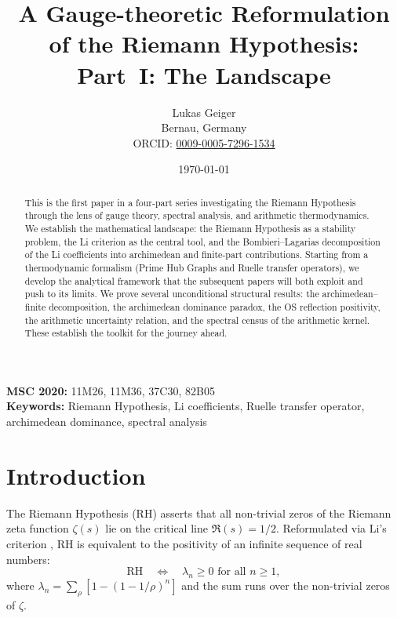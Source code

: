 \documentclass[12pt,a4paper]{article}
\title{A Gauge-theoretic Reformulation of the Riemann Hypothesis:\\
Part~I: The Landscape}
\author{Lukas Geiger\\
\small Bernau, Germany\\
\small ORCID: \href{https://orcid.org/0009-0005-7296-1534}{0009-0005-7296-1534}}
\date{\today}
\theoremstyle{definition}
\theoremstyle{remark}
\begin{document}
\maketitle

\begin{abstract}
This is the first paper in a four-part series investigating the Riemann Hypothesis through the lens of gauge theory, spectral analysis, and arithmetic thermodynamics. We establish the mathematical landscape: the Riemann Hypothesis as a stability problem, the Li criterion as the central tool, and the Bombieri--Lagarias decomposition of the Li coefficients into archimedean and finite-part contributions. Starting from a thermodynamic formalism (Prime Hub Graphs and Ruelle transfer operators), we develop the analytical framework that the subsequent papers will both exploit and push to its limits. We prove several unconditional structural results: the archimedean--finite decomposition, the archimedean dominance paradox, the OS reflection positivity, the arithmetic uncertainty relation, and the spectral census of the arithmetic kernel. These establish the toolkit for the journey ahead.
\end{abstract}

\noindent\textbf{MSC 2020:} 11M26, 11M36, 37C30, 82B05\\
\textbf{Keywords:} Riemann Hypothesis, Li coefficients, Ruelle transfer operator, archimedean dominance, spectral analysis

\tableofcontents


\section{Introduction}
\label{sec:intro}

The Riemann Hypothesis (RH) asserts that all non-trivial zeros of the Riemann zeta function $\zeta(s)$ lie on the critical line $\Re(s) = 1/2$. Reformulated via Li's criterion \cite{Li1997}, RH is equivalent to the positivity of an infinite sequence of real numbers:
\begin{equation}
\label{eq:li-criterion}
\text{RH} \quad \Longleftrightarrow \quad \lambda_n \geq 0 \text{ for all } n \geq 1,
\end{equation}
where $\lambda_n = \sum_\rho [1 - (1-1/\rho)^n]$ and the sum runs over the non-trivial zeros of $\zeta$.
\end{document}
